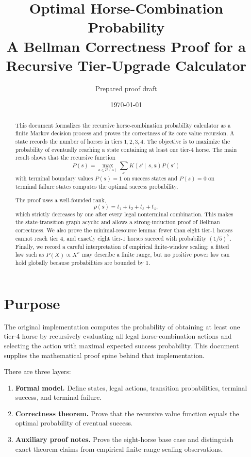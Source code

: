 \documentclass[11pt]{article}
\title{
    \vspace{-1.5em}
    Optimal Horse-Combination Probability\\
    \large A Bellman Correctness Proof for a Recursive Tier-Upgrade Calculator
}
\author{Prepared proof draft}
\date{\today}
\newcommand{\Actions}{\mathcal{U}}
\newcommand{\rank}{\rho}
\begin{document}
\maketitle

\begin{abstract}
This document formalizes the recursive horse-combination probability calculator as a finite Markov decision process and proves the correctness of its core value recursion.  A state records the number of horses in tiers \(1,2,3,4\).  The objective is to maximize the probability of eventually reaching a state containing at least one tier-4 horse.  The main result shows that the recursive function
\[
    P(s)=\max_{a\in \Actions(s)} \sum_{s'} K(s' \mid s,a)P(s')
\]
with terminal boundary values \(P(s)=1\) on success states and \(P(s)=0\) on terminal failure states computes the optimal success probability.

The proof uses a well-founded rank,
\[
    \rank(s)=t_1+t_2+t_3+t_4,
\]
which strictly decreases by one after every legal nonterminal combination.  This makes the state-transition graph acyclic and allows a strong-induction proof of Bellman correctness.  We also prove the minimal-resource lemma: fewer than eight tier-1 horses cannot reach tier 4, and exactly eight tier-1 horses succeed with probability \((1/5)^7\).  Finally, we record a careful interpretation of empirical finite-window scaling: a fitted law such as \(P(X)\propto X^\alpha\) may describe a finite range, but no positive power law can hold globally because probabilities are bounded by \(1\).
\end{abstract}

\tableofcontents

\section{Purpose}

The original implementation computes the probability of obtaining at least one tier-4 horse by recursively evaluating all legal horse-combination actions and selecting the action with maximal expected success probability.  This document supplies the mathematical proof spine behind that implementation.

There are three layers:

\begin{enumerate}[label=\textbf{Layer \arabic*.}]
    \item \textbf{Formal model.}  Define states, legal actions, transition probabilities, terminal success, and terminal failure.
    \item \textbf{Correctness theorem.}  Prove that the recursive value function equals the optimal probability of eventual success.
    \item \textbf{Auxiliary proof notes.}  Prove the eight-horse base case and distinguish exact theorem claims from empirical finite-range scaling observations.
\end{enumerate}
\end{document}
